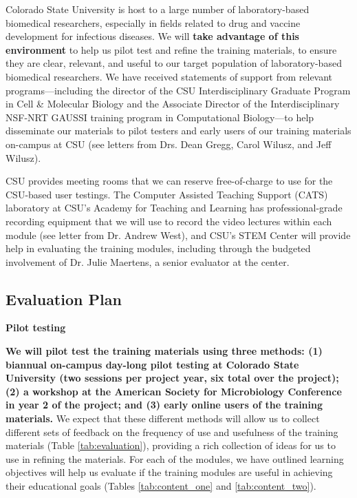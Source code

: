 \documentclass[pdftex,english,11pt,parskip=half]{scrartcl}
\begin{document}
Colorado State University is host to a large number of laboratory-based
biomedical researchers, especially in fields related to drug and vaccine
development for infectious diseases. We will \textbf{take advantage of this
environment} to help us pilot test and refine the training materials, to ensure
they are clear, relevant, and useful to our target population of
laboratory-based biomedical researchers. We have received statements of support
from relevant programs---including the director of the CSU Interdisciplinary
Graduate Program in Cell \& Molecular Biology and the Associate Director of the
Interdisciplinary NSF-NRT GAUSSI training program in Computational Biology---to
help disseminate our materials to pilot testers and early users of our training
materials on-campus at CSU (see letters from Drs. Dean Gregg, Carol Wilusz, and Jeff
Wilusz). 

CSU provides meeting rooms
that we can reserve free-of-charge to use for the CSU-based user testings. The
Computer Assisted Teaching Support (CATS) laboratory at CSU's Academy for
Teaching and Learning has professional-grade recording equipment that we will
use to record the video lectures within each module (see letter from Dr. Andrew
West), and CSU's STEM Center will provide help in evaluating the training modules,
including through the budgeted involvement of Dr. Julie Maertens, a senior
evaluator at the center. 

\subsection{Evaluation Plan}

\textbf{Pilot testing}

\textbf{We will pilot test the training materials using three methods: (1) biannual on-campus  day-long pilot testing at Colorado State University (two sessions per project year, six total over the project); (2) a workshop at the American Society for Microbiology Conference in year 2 of the project; and (3) early online users of the training materials.} We expect that these different methods will allow us to collect different sets of 
feedback on the frequency of use and usefulness of the training materials (Table \ref{tab:evaluation}), providing a rich collection of ideas for us to use in refining the materials. For each of the modules, we have outlined learning objectives will help us evaluate if the training modules are useful in achieving their educational goals (Tables \ref{tab:content_one} and \ref{tab:content_two}).
\end{document}
